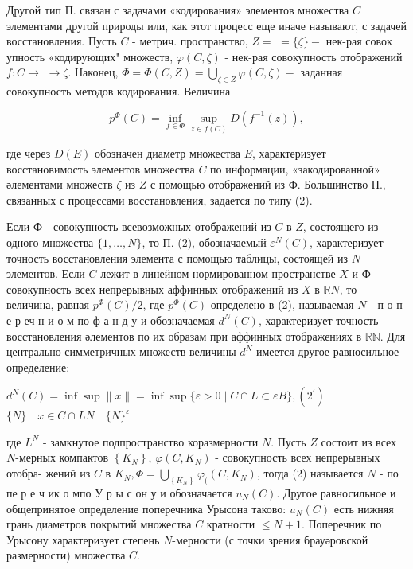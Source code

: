 \documentclass[10pt]{article}
\begin{document}
Другой тип П. связан с задачами «кодирования» элементов множества $C$ элементами другой природы или, как этот процесс еще иначе называют, с задачей восстановления. Пусть $C$ - метрич. пространство, $Z=$ $=\{\zeta\}-$ нек-рая совок упность «кодирующих" множеств, $\varphi(C, \zeta)$ - нек-рая совокупность отображений $f: C \rightarrow$ $\rightarrow \zeta$. Наконец, $\Phi=\Phi(C, Z)=\bigcup_{\zeta \in Z} \varphi(C, \zeta)-$ заданная совокупность методов кодирования. Величина



\[

p^{\Phi}(C)=\inf _{f \in \Phi} \sup _{z \in f(C)} D\left(f^{-1}(z)\right),

\]



где через $D(E)$ обозначен диаметр множества $E$, характеризует восстановимость элементов множества $C$ по информации, «закодированной» әлементами множеств $\zeta$ из $Z$ с помощью отображений из Ф. Большинство П., связанных с процессами восстановления, задается по типу (2).



Если Ф - совокупность всевозможных отображений из $C$ в $Z$, состоящего из одного множества $\{1, \ldots, N\}$, то П. (2), обозначаемый $\varepsilon^{N}(C)$, характеризует точность восстановления элемента с помощью таблицы, состоящей из $N$ элементов. Если $C$ лежит в линейном нормированном пространстве $X$ и $Ф-$ совокупность всех непрерывных аффинных отображений из $X$ в $\mathbb{R} N$, то величина, равная $p^{\Phi}(C) / 2$, где $p^{\Phi}(C)$ определено в (2), называемая $N$ - п о п е р еч н и о м по ф а н д у и обозначаемая $d^{N}(C)$, характеризует точность восстановления әлементов по их образам при аффинных отображениях в $\mathbb{R N}$. Для центрально-симметричных множеств величины $d^{N}$ имеется другое равносильное определение:



$d^{N}(C)=\inf \sup \|x\|=\inf \sup \{\varepsilon>0 \mid C \cap L \subset \varepsilon B\},\left(2^{\prime}\right)$ $\{N\} \quad x \in C \cap L N \quad\{N\}^{\varepsilon}$



где $L^{N}$ - замкнутое подпространство коразмерности $N$. Пусть $Z$ состоит из всех $N$-мерных компактов $\left\{K_{N}\right\}$, $\varphi\left(C, K_{N}\right)$ - совокупность всех непрерывных отобра- жений из $C$ в $K_{N}, \Phi=\bigcup_{\left\{K_{N}\right\}} \varphi_{(}\left(C, K_{N}\right)$, тогда (2) называется $N$ - по пе р е ч ик о мпо У р ы с он у и обозначается $u_{N}(C)$. Другое равносильное и общепринятое определение поперечника Урысона таково: $u_{N}(C)$ есть нижняя грань диаметров покрытий множества $C$ кратности $\leqslant N+1$. Поперечник по Урысону характеризует степень $N$-мерности (с точки зрения брауәровской размерности) множества $C$.
\end{document}
